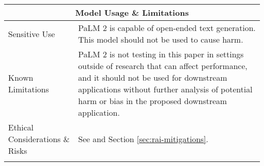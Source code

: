 \begin{longtable}[c]{ p{} | p{} }
\multicolumn{2}{c}{\textbf{Model Usage \& Limitations}}      \\ \toprule
\multicolumn{1}{l|}{Sensitive Use} & PaLM 2 is capable of open-ended text generation. This model should not be used to cause harm.  \\ \midrule
\multicolumn{1}{l|}{Known Limitations} & PaLM 2 is not testing in this paper in settings outside of research that can affect performance, and it should not be used for downstream applications without further analysis of potential harm or bias in the proposed downstream application.  \\ \midrule
\multicolumn{1}{l|}{Ethical Considerations \& Risks} & See \cite{chowdhery2022palm} and Section \ref{sec:rai-mitigations}. \\ \bottomrule

\label{tab:modelcard}
\end{longtable}

